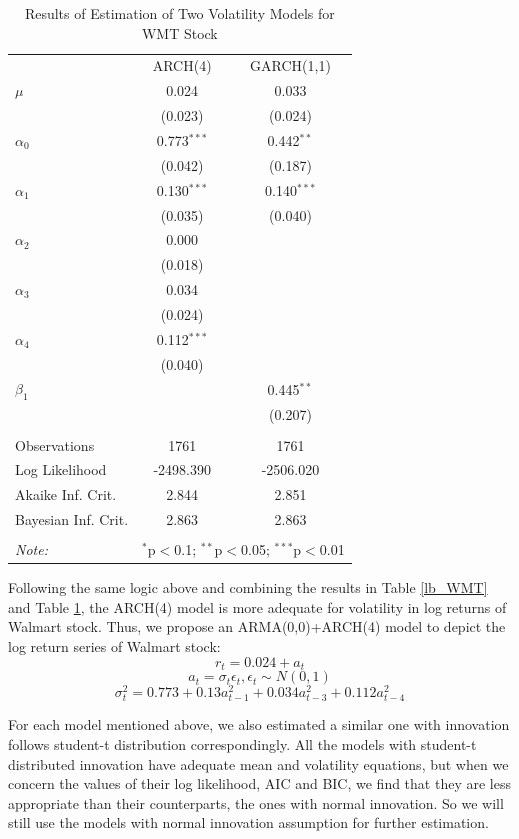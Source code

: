 \documentclass[paper=a4, fontsize=11pt]{article}
\begin{document}
\begin{table}[!htbp] \centering 
  \caption{Results of Estimation of Two Volatility Models for WMT Stock} 
  \label{est_WMT} 
\begin{tabular}{@{\extracolsep{5pt}}lcc} 
\\[-1.8ex]\hline 
\hline
 & ARCH(4) & GARCH(1,1) \\ 
  $\mu$ & 0.024 & 0.033 \\ 
  & (0.023) & (0.024) \\ 
 $\alpha_0$ & 0.773$^{***}$ & 0.442$^{**}$ \\ 
  & (0.042) & (0.187) \\ 
 $\alpha_1$ & 0.130$^{***}$ & 0.140$^{***}$ \\ 
  & (0.035) & (0.040) \\ 
 $\alpha_2$ & 0.000 &  \\ 
  & (0.018) &  \\ 
 $\alpha_3$ & 0.034 &  \\ 
  & (0.024) &  \\ 
 $\alpha_4$ & 0.112$^{***}$ &  \\ 
  & (0.040) &  \\ 
 $\beta_1$ &  & 0.445$^{**}$ \\ 
  &  & (0.207) \\ 
\hline \\[-1.8ex] 
Observations & 1761 & 1761 \\ 
Log Likelihood & -2498.390 & -2506.020 \\ 
Akaike Inf. Crit. & 2.844 & 2.851 \\ 
Bayesian Inf. Crit. & 2.863 & 2.863 \\ 
\hline 
\hline \\[-1.8ex] 
\textit{Note:}  & \multicolumn{2}{r}{$^{*}$p$<$0.1; $^{**}$p$<$0.05; $^{***}$p$<$0.01} \\ 
\end{tabular} 
\end{table} 

Following the same logic above and combining the results in Table \ref{lb_WMT} and Table \ref{est_WMT}, the ARCH(4) model is more adequate for volatility in log returns of Walmart stock. Thus, we propose an ARMA(0,0)+ARCH(4) model to depict the log return series of Walmart stock:
\[ r_t = 0.024+a_t\]
\[ a_t = \sigma_t \epsilon_t, \epsilon_t \sim N(0,1) \]
\[ \sigma_t^2 = 0.773+0.13a_{t-1}^2+0.034a_{t-3}^2+0.112a_{t-4}^2 \]

For each model mentioned above, we also estimated a similar one with innovation follows student-t distribution correspondingly. All the models with student-t distributed innovation have adequate mean and volatility equations, but when we concern the values of their log likelihood, AIC and BIC, we find that they are less appropriate than their counterparts, the ones with normal innovation. So we will still use the models with normal innovation assumption for further estimation. 
\end{document}
